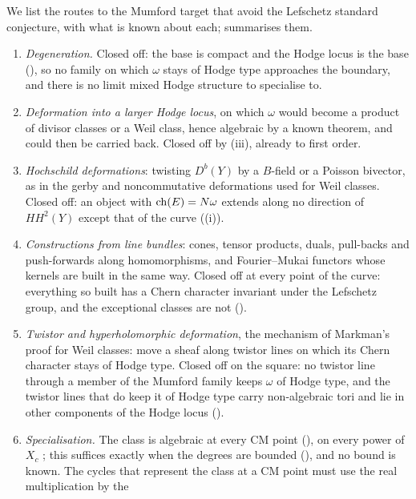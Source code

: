 \begin{remark}\label{rem:bypassaudit}
We list the routes to the Mumford target that avoid the Lefschetz standard
conjecture, with what is known about each;  summarises
them.
\begin{enumerate}[label=\textup{(\arabic*)},leftmargin=2.6em,itemsep=2pt]
\item \emph{Degeneration.} Closed off: the base is compact and the Hodge
  locus is the base (), so no family on which
  $\omega$ stays of Hodge type approaches the boundary, and there is no limit
  mixed Hodge structure to specialise to.
\item \emph{Deformation into a larger Hodge locus}, on which $\omega$ would
  become a product of divisor classes or a Weil class, hence algebraic by a
  known theorem, and could then be carried back. Closed off by
  (iii), already to first order.
\item \emph{Hochschild deformations}: twisting $D^{b}(Y)$ by a $B$-field or a
  Poisson bivector, as in the gerby and noncommutative deformations used for
  Weil classes. Closed off: an object with $\operatorname{ch}(E)=N\omega$ extends along no
  direction of $HH^{2}(Y)$ except that of the curve
  ((i)).
\item \emph{Constructions from line bundles}: cones, tensor products, duals,
  pull-backs and push-forwards along homomorphisms, and Fourier--Mukai
  functors whose kernels are built in the same way. Closed off at every point
  of the curve: everything so built has a Chern character invariant under the
  Lefschetz group, and the exceptional classes are not
  ().
\item \emph{Twistor and hyperholomorphic deformation}, the mechanism of
  Markman's proof for Weil classes: move a sheaf along twistor lines on which
  its Chern character stays of Hodge type. Closed off on the square: no
  twistor line through a member of the Mumford family keeps $\omega$ of Hodge
  type, and the twistor lines that do keep it of Hodge type carry
  non-algebraic tori and lie in other components of the Hodge locus
  ().
\item \emph{Specialisation.} The class is algebraic at every CM point
  (), on every power of $X_{c}$ \cite[Theorem~1.3]{Li26};
  this suffices exactly when the degrees are bounded
  (), and no bound is known. The cycles that
  represent the class at a CM point must use the real multiplication by the

\end{enumerate}
\end{remark}
